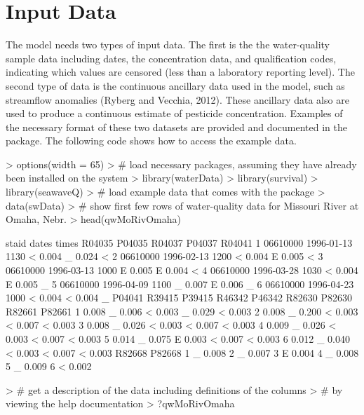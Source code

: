 \documentclass[11pt]{article}
\begin{document}
\section{Input Data}

The model needs two types of input data.  The first is the the water-quality sample data including dates, the concentration data, and qualification codes, indicating which values are censored (less than a laboratory reporting level).  The second type of data is the continuous ancillary data used in the model, such as streamflow anomalies (Ryberg and Vecchia, 2012).  These ancillary data also are used to produce a continuous estimate of pesticide concentration.  Examples of the necessary format of these two datasets are provided and documented in the package.  The following code shows how to access the example data.
\vspace{5 mm}

\begin{Schunk}
\begin{Sinput}
> options(width = 65)
> # load necessary packages, assuming they have already been installed on the system
> library(waterData)
> library(survival)
> library(seawaveQ)
> # load example data that comes with the package
> data(swData)
> # show first few rows of water-quality data for Missouri River at Omaha, Nebr.
> head(qwMoRivOmaha)
\end{Sinput}
\begin{Soutput}
     staid      dates times R04035 P04035 R04037 P04037 R04041
1 06610000 1996-01-13  1130      <  0.004      _  0.024      <
2 06610000 1996-02-13  1200      <  0.004      E  0.005      <
3 06610000 1996-03-13  1000      E  0.005      E  0.004      <
4 06610000 1996-03-28  1030      <  0.004      E  0.005      _
5 06610000 1996-04-09  1100      _  0.007      E  0.006      _
6 06610000 1996-04-23  1000      <  0.004      <  0.004      _
  P04041 R39415 P39415 R46342 P46342 R82630 P82630 R82661 P82661
1  0.008      _  0.006      <  0.003      _  0.029      <  0.003
2  0.008      _  0.200      <  0.003      <  0.007      <  0.003
3  0.008      _  0.026      <  0.003      <  0.007      <  0.003
4  0.009      _  0.026      <  0.003      <  0.007      <  0.003
5  0.014      _  0.075      E  0.003      <  0.007      <  0.003
6  0.012      _  0.040      <  0.003      <  0.007      <  0.003
  R82668 P82668
1      _  0.008
2      _  0.007
3      E  0.004
4      _  0.008
5      _  0.009
6      <  0.002
\end{Soutput}
\begin{Sinput}
> # get a description of the data including definitions of the columns
> # by viewing the help documentation
> ?qwMoRivOmaha
\end{Sinput}
\end{Schunk}
\end{document}

